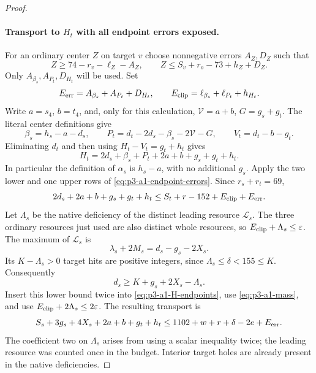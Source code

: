 \documentclass[11pt,letterpaper]{article}
\theoremstyle{definition}\newtheorem{definition}[theorem]{Definition}
\begin{document}
\begin{proof}
\paragraph{Transport to $H_t$ with all endpoint errors exposed.}
For an ordinary center $Z$ on target $v$ choose nonnegative errors
$A_Z,D_Z$ such that
\begin{equation}\label{eq:p3-a1-endpoint-errors}
 Z\ge74-r_v-\ell_Z-A_Z,\qquad
 Z\le S_v+r_o-73+h_Z+D_Z.
\end{equation}
Only $A_{\beta_s},A_{P_t},D_{H_t}$ will be used. Set
\[
 E_{\rm err}=A_{\beta_s}+A_{P_t}+D_{H_t},\qquad
 E_{\rm clip}=\ell_{\beta_s}+\ell_{P_t}+h_{H_t}.
\]
Write $a=s_4$, $b=t_4$, and, only for this calculation,
$\mathcal V=a+b$, $G=g_s+g_t$. The literal center definitions give
\[
 \beta_s=h_s-a-d_s,\qquad
 P_t=d_t-2d_s-\beta_s-2\mathcal V-G,\qquad
 V_t=d_t-b-g_t.
\]
Eliminating $d_t$ and then using $H_t-V_t=g_t+h_t$ gives
\begin{equation}\label{eq:p3-a1-H-identity}
 H_t=2d_s+\beta_s+P_t+2a+b+g_s+g_t+h_t.
\end{equation}
In particular the definition of $\alpha_s$ is $h_s-a$, with no
additional $g_s$. Apply the two lower and one upper rows of
\eqref{eq:p3-a1-endpoint-errors}. Since $r_s+r_t=69$,
\begin{equation}\label{eq:p3-a1-H-endpoints}
 2d_s+2a+b+g_s+g_t+h_t
 \le S_t+r-152+E_{\rm clip}+E_{\rm err}.
\end{equation}
Let $\Lambda_s$ be the native deficiency of the distinct leading
resource $\mathcal L_s$. The three ordinary resources just used are
also distinct whole resources, so
$E_{\rm clip}+\Lambda_s\le\varepsilon$.
The maximum of $\mathcal L_s$ is
\[
 \lambda_s+2M_s=d_s-g_s-2X_s.
\]
Its $K-\Lambda_s>0$ target hits are positive integers, since
$\Lambda_s\le\delta<155\le K$. Consequently
\begin{equation}\label{eq:p3-a1-leading}
 d_s\ge K+g_s+2X_s-\Lambda_s.
\end{equation}
Insert this lower bound twice into \eqref{eq:p3-a1-H-endpoints}, use
\eqref{eq:p3-a1-mass}, and use
$E_{\rm clip}+2\Lambda_s\le2\varepsilon$. The resulting transport is
\begin{equation}\label{eq:p3-a1-H-transport}
 S_s+3g_s+4X_s+2a+b+g_t+h_t
 \le1102+w+r+\delta-2e+E_{\rm err}.
\end{equation}
The coefficient two on $\Lambda_s$ arises from using a scalar
inequality twice; the leading resource was counted once in the budget.
Interior target holes are already present in the native deficiencies.


\end{proof}
\end{document}
